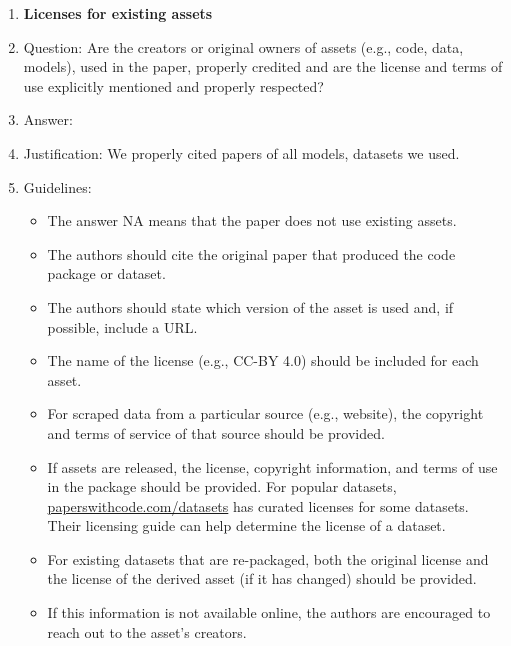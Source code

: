 \documentclass{article}
\theoremstyle{plain}
\theoremstyle{definition}
\theoremstyle{remark}
\begin{document}
\begin{enumerate}
\item {\bf Licenses for existing assets}
    \item[] Question: Are the creators or original owners of assets (e.g., code, data, models), used in the paper, properly credited and are the license and terms of use explicitly mentioned and properly respected?
    \item[] Answer: \answerYes{} %
    \item[] Justification: We properly cited papers of all models, datasets we used.
    \item[] Guidelines:
    \begin{itemize}
        \item The answer NA means that the paper does not use existing assets.
        \item The authors should cite the original paper that produced the code package or dataset.
        \item The authors should state which version of the asset is used and, if possible, include a URL.
        \item The name of the license (e.g., CC-BY 4.0) should be included for each asset.
        \item For scraped data from a particular source (e.g., website), the copyright and terms of service of that source should be provided.
        \item If assets are released, the license, copyright information, and terms of use in the package should be provided. For popular datasets, \url{paperswithcode.com/datasets} has curated licenses for some datasets. Their licensing guide can help determine the license of a dataset.
        \item For existing datasets that are re-packaged, both the original license and the license of the derived asset (if it has changed) should be provided.
        \item If this information is not available online, the authors are encouraged to reach out to the asset's creators.
    \end{itemize}


\end{enumerate}
\end{document}
